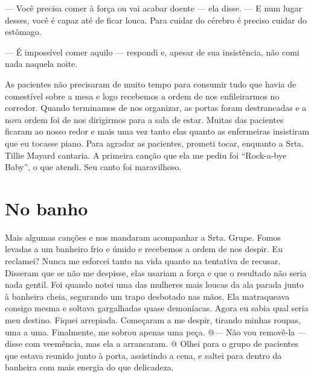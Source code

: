 --- Você precisa comer à força ou vai acabar doente --- ela disse. --- E
num lugar desses, você é capaz até de ficar louca. Para cuidar do
cérebro é preciso cuidar do estômago.

--- É impossível comer aquilo --- respondi e, apesar de sua insistência,
não comi nada naquela noite.

As pacientes não precisaram de muito tempo para consumir tudo que havia
de comestível sobre a mesa e logo recebemos a ordem de nos enfileirarmos
no corredor. Quando terminamos de nos organizar, as portas foram
destrancadas e a nova ordem foi de nos dirigirmos para a sala de estar.
Muitas das pacientes ficaram ao nosso redor e mais uma vez tanto elas
quanto as enfermeiras insistiram que eu tocasse piano. Para agradar as
pacientes, prometi tocar, enquanto a Srta. Tillie Mayard cantaria. A
primeira canção que ela me pediu foi ``Rock-a-bye Baby'', o que atendi.
Seu canto foi maravilhoso.

\chapter{No banho}\label{capuxedtulo-xi-no-banho}

Mais algumas canções e nos mandaram acompanhar a Srta. Grupe. Fomos
levadas a um banheiro frio e úmido e recebemos a ordem de nos despir. Eu
reclamei? Nunca me esforcei tanto na vida quanto na tentativa de
recusar. Disseram que se não me despisse, elas usariam a força e que o
resultado não seria nada gentil. Foi quando notei uma das mulheres mais
loucas da ala parada junto à banheira cheia, segurando um trapo
desbotado nas mãos. Ela matraqueava consigo mesma e soltava gargalhadas
quase demoníacas. Agora eu sabia qual seria meu destino. Fiquei
arrepiada. Começaram a me despir, tirando minhas roupas, uma a uma.
Finalmente, me sobrou apenas uma peça. @--- Não vou removê-la --- disse
com veemência, mas ela a arrancaram. @ Olhei para o grupo de pacientes
que estava reunido junto à porta, assistindo a cena, e saltei para
dentro da banheira com mais energia do que delicadeza.

